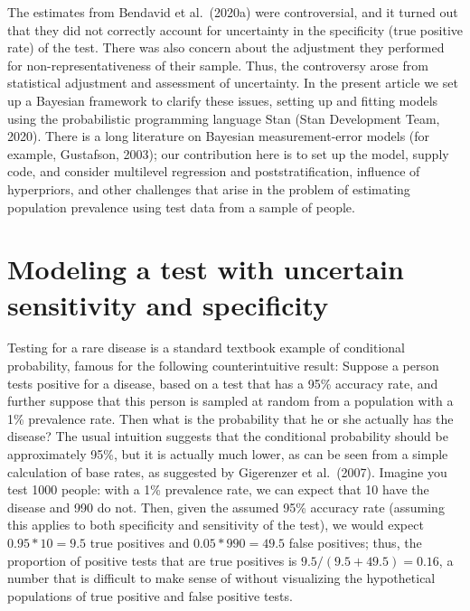 \documentclass[11pt]{article}
\begin{document}
The estimates from Bendavid et al.\ (2020a) were controversial, and it turned out that they did not correctly account for uncertainty in the specificity (true positive rate) of the test.  There was also concern about the adjustment they performed for non-representativeness of their sample.  Thus, the controversy arose from statistical adjustment and assessment of uncertainty.  In the present article we set up a Bayesian framework to clarify these issues, setting up and fitting models using the probabilistic programming language Stan (Stan Development Team, 2020).  There is a long literature on Bayesian measurement-error models (for example, Gustafson, 2003); our contribution here is to set up the model, supply code, and consider multilevel regression and poststratification, influence of hyperpriors, and other challenges that arise in the problem of estimating population prevalence using test data from a sample of people.


\section{Modeling a test with uncertain sensitivity and specificity}\label{model1}

Testing for a rare disease is a standard textbook example of conditional probability, famous for the following counterintuitive result:  Suppose a person tests positive for a disease, based on a test that has a 95\% accuracy rate, and further suppose that this person is sampled at random from a population with a 1\% prevalence rate.  Then what is the probability that he or she actually has the disease? The usual intuition suggests that the conditional probability should be approximately 95\%, but it is actually much lower, as can be seen from a simple calculation of base rates, as suggested by Gigerenzer et al.\ (2007).  Imagine you test 1000  people:  with a 1\% prevalence rate, we can expect that 10 have the disease and 990 do not.  Then, given the assumed 95\% accuracy rate (assuming this applies to both specificity and sensitivity of the test), we would expect $0.95*10=9.5$ true positives and $0.05*990 =  49.5$ false positives; thus, the proportion of positive tests that are true positives is $9.5/(9.5+49.5) = 0.16$, a number that is difficult to make sense of without visualizing the hypothetical populations of true positive and false positive tests.
\end{document}
